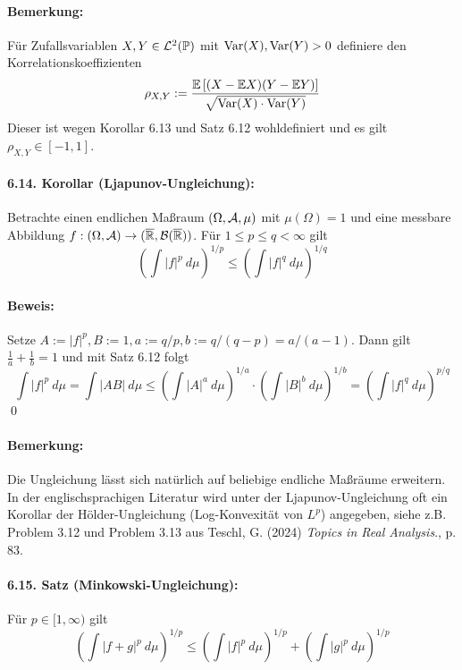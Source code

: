 \paragraph{Bemerkung:}F\"ur Zufallsvariablen $X,Y\in\mathcal{L}^2(\mathbb{P})$ mit $\operatorname{Var}(X),\operatorname{Var}(Y)>0$ definiere den Korrelationskoeffizienten
$$\rho_{X,Y}:=\dfrac{\mathbb{E}\left[(X-\mathbb{E} X)(Y-\mathbb{E} Y)\right]}{\sqrt{\operatorname{Var}(X)\cdot\operatorname{Var}(Y)}}$$
Dieser ist wegen Korollar 6.13 und Satz 6.12 wohldefiniert und es gilt $\rho_{X,Y}\in[-1,1]$.

\paragraph{6.14. Korollar (Ljapunov-Ungleichung):}Betrachte einen endlichen Ma\ss{}raum $(\Omega,\mathcal{A},\mu)$ mit $\mu(\Omega)=1$ und eine messbare Abbildung $f:(\Omega,\mathcal{A})\to(\overline{\mathbb{R}},\mathcal{B}(\overline{\mathbb{R}}))$. F\"ur $1\leq p\leq q<\infty$ gilt
$$\left(\int |f|^p\ d\mu\right)^{1/p}\leq\left(\int |f|^q\ d\mu\right)^{1/q}$$
 
 \paragraph{Beweis:}Setze $A:=|f|^p, B:=1, a:=q/p, b:=q/(q-p)=a/(a-1)$. Dann gilt $\frac{1}{a}+\frac{1}{b}=1$ und mit Satz 6.12 folgt
 $$\int |f|^p\ d\mu=\int |AB|\ d\mu\leq\left(\int |A|^a\ d\mu\right)^{1/a}\cdot\left(\int |B|^b\ d\mu\right)^{1/b}=\left(\int |f|^q\ d\mu\right)^{p/q}$$
 \qed
 
 \paragraph{Bemerkung:} Die Ungleichung l\"asst sich nat\"urlich auf beliebige endliche Ma\ss{}r\"aume erweitern. In der englischsprachigen Literatur wird unter der Ljapunov-Ungleichung oft ein Korollar der H\"older-Ungleichung (Log-Konvexit\"at von $L^p$) angegeben, siehe z.B. Problem 3.12  und Problem 3.13 aus Teschl, G. (2024) \textit{Topics in Real Analysis}., p. 83. 
 
 \paragraph{6.15. Satz (Minkowski-Ungleichung):}F\"ur $p\in[1,\infty)$ gilt
 $$\left(\int|f+g|^p\ d\mu\right)^{1/p}\leq\left(\int |f|^p\ d\mu\right)^{1/p}+\left(\int |g|^p\ d\mu\right)^{1/p}$$
 
